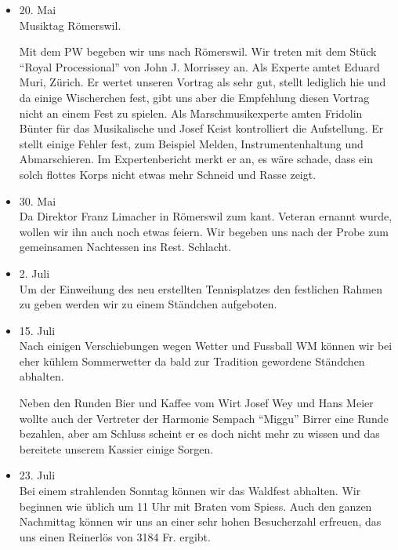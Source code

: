 \begin{history}
\begin{itemize}
        \item 20. Mai\\
              Musiktag Römerswil.

              Mit dem PW begeben wir uns nach Römerswil. Wir
              treten mit dem Stück \enquote{Royal Processional} von John J. Morrissey an.
              Als Experte amtet Eduard Muri, Zürich. Er wertet unseren Vortrag als
              sehr gut, stellt lediglich hie und da einige Wischerchen fest, gibt uns
              aber die Empfehlung diesen Vortrag nicht an einem Fest zu spielen. Als
              Marschmusikexperte amten Fridolin Bünter für das Musikalische und Josef
              Keist kontrolliert die Aufstellung. Er stellt einige Fehler fest, zum
              Beispiel Melden, Instrumentenhaltung und Abmarschieren. Im
              Expertenbericht merkt er an, es wäre schade, dass ein solch flottes
              Korps nicht etwas mehr Schneid und Rasse zeigt.

        \item 30. Mai\\
              Da Direktor Franz Limacher in Römerswil zum kant. Veteran ernannt wurde,
              wollen wir ihn auch noch etwas feiern. Wir begeben uns nach der Probe
              zum gemeinsamen Nachtessen ins Rest. Schlacht.

        \item 2. Juli\\
              Um der Einweihung des neu erstellten Tennisplatzes den festlichen Rahmen
              zu geben werden wir zu einem Ständchen aufgeboten.

        \item 15. Juli\\
              Nach einigen Verschiebungen wegen Wetter und Fussball WM können wir bei
              eher kühlem Sommerwetter da bald zur Tradition gewordene Ständchen
              abhalten.

              Neben den Runden Bier und Kaffee vom Wirt Josef Wey und Hans Meier
              wollte auch der Vertreter der Harmonie Sempach \enquote{Miggu} Birrer eine
              Runde bezahlen, aber am Schluss scheint er es doch nicht mehr zu wissen
              und das bereitete unserem Kassier einige Sorgen.

        \item 23. Juli\\
              Bei einem strahlenden Sonntag können wir das Waldfest abhalten. Wir
              beginnen wie üblich um 11 Uhr mit Braten vom Spiess. Auch den ganzen
              Nachmittag können wir uns an einer sehr hohen Besucherzahl erfreuen, das
              uns einen Reinerlös von 3184 Fr. ergibt.


\end{itemize}
\end{history}
